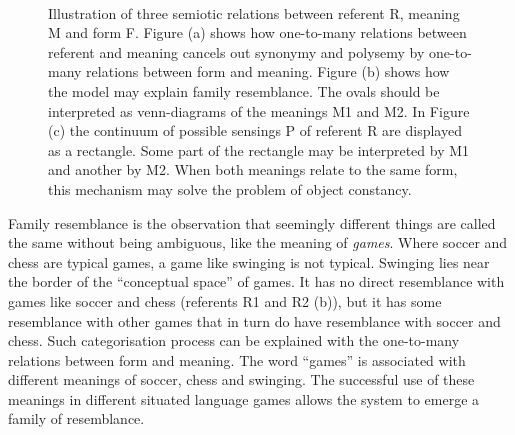 \begin{figure}
\centering
{}
\\
\caption{Illustration of three semiotic relations between referent R, meaning M and form F. Figure (a) shows how one-to-many relations between referent and meaning cancels out synonymy and polysemy by one-to-many relations between form and meaning. Figure (b) shows how the model may explain family resemblance. The ovals should be interpreted as venn-diagrams of the meanings M1 and M2. In Figure (c) the continuum of possible sensings P of referent R are displayed as a rectangle. Some part of the rectangle may be interpreted by M1 and another by M2. When both meanings relate to the same form, this mechanism may solve the problem of object constancy.}
\label{f:disc:semiotic1}
\end{figure}


 Family resemblance \citep{wittgenstein:1958} is the observation that seemingly different things are called the same without being ambiguous, like the meaning of {\it games}. Where soccer and chess are typical games, a game like swinging is not typical. Swinging lies near the border of the ``conceptual space'' of games. It has no direct resemblance with games like soccer  and chess (referents R1 and R2  (b)), but it has some resemblance with other games that in turn do have resemblance with soccer and chess. Such categorisation process can be explained with the one-to-many relations between form and meaning. The word ``games'' is associated with different meanings of soccer, chess and swinging. The successful use of these meanings in different situated language games allows the system to emerge a family of resemblance.


